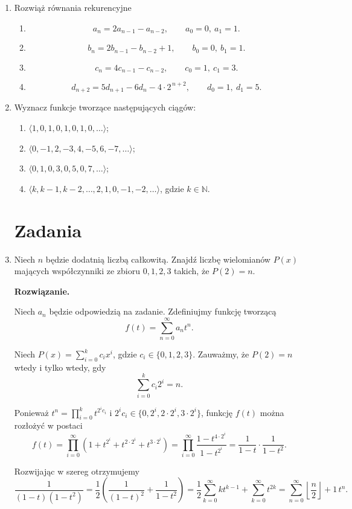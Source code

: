 \documentclass{lecture-kuznia}
\newenvironment{solutionbox}{%
    \begin{mdframed}[style=solstyle]\noindent\textbf{Rozwiązanie.}\par\smallskip
  }{%
    \end{mdframed}
  }
\begin{document}
\begin{enumerate}[label=\textbf{Zad. \arabic*}]
\item Rozwiąż równania rekurencyjne
\begin{enumerate}
  \item[(a)] \[
    a_n = 2a_{n-1} - a_{n-2}, \qquad a_0 = 0,\ a_1 = 1.
  \]
  \item[(b)] \[
    b_n = 2b_{n-1} - b_{n-2} + 1, \qquad b_0 = 0,\ b_1 = 1.
  \]
  \item[(c)] \[
    c_n = 4c_{n-1} - c_{n-2}, \qquad c_0 = 1,\ c_1 = 3.
  \]
  \item[(d)] \[
    d_{n+2} = 5d_{n+1} - 6d_n - 4\cdot 2^{\,n+2}, \qquad d_0 = 1,\ d_1 = 5.
  \]
\end{enumerate}
\item Wyznacz funkcje tworzące następujących ciągów:

\begin{enumerate}
    \item $\langle 1, 0, 1, 0, 1, 0, 1, 0, \dots \rangle$;
    \item $\langle 0, -1, 2, -3, 4, -5, 6, -7, \dots \rangle$;
    \item $\langle 0, 1, 0, 3, 0, 5, 0, 7, \dots \rangle$;
    \item $\langle k, k-1, k-2, \dots, 2, 1, 0, -1, -2, \dots \rangle$, gdzie $k \in \mathbb{N}$.
\end{enumerate}
\section{\huge{Zadania}}
\item Niech $n$ będzie dodatnią liczbą całkowitą. Znajdź liczbę wielomianów $P(x)$ mających współczynniki ze zbioru \({0, 1, 2, 3}\) takich, że $P(2) = n$.
\begin{solutionbox}
Niech \(a_n\) będzie odpowiedzią na zadanie. Zdefiniujmy funkcję tworzącą
\[
f(t) = \sum_{n=0}^{\infty} a_n t^n.
\]

Niech \(P(x) = \sum_{i=0}^{k} c_i x^i\), gdzie \(c_i \in \{0,1,2,3\}\). Zauważmy, że \(P(2) = n\) wtedy i tylko wtedy, gdy
\[
\sum_{i=0}^{k} c_i 2^i = n.
\]

Ponieważ \(t^n = \prod_{i=0}^{k} t^{2^i c_i}\) i \(2^i c_i \in \{0, 2^i, 2\cdot 2^i, 3\cdot 2^i\}\), funkcję \(f(t)\) można rozłożyć w postaci
\[
f(t) = \prod_{i=0}^{\infty} \left(1 + t^{2^i} + t^{2\cdot 2^i} + t^{3\cdot 2^i}\right)
= \prod_{i=0}^{\infty} \frac{1 - t^{4 \cdot 2^i}}{1 - t^{2^i}}
= \frac{1}{1-t} \cdot \frac{1}{1-t^2}.
\]

Rozwijając w szereg otrzymujemy
\[
\frac{1}{(1-t)(1-t^2)} = \frac{1}{2} \left( \frac{1}{(1-t)^2} + \frac{1}{1-t^2} \right)
= \frac{1}{2} \sum_{k=0}^{\infty} k t^{k-1} + \sum_{k=0}^{\infty} t^{2k}
= \sum_{n=0}^{\infty} \left\lfloor \frac{n}{2} \right\rfloor + 1 \, t^n.
\]


\end{solutionbox}
\end{enumerate}
\end{document}
